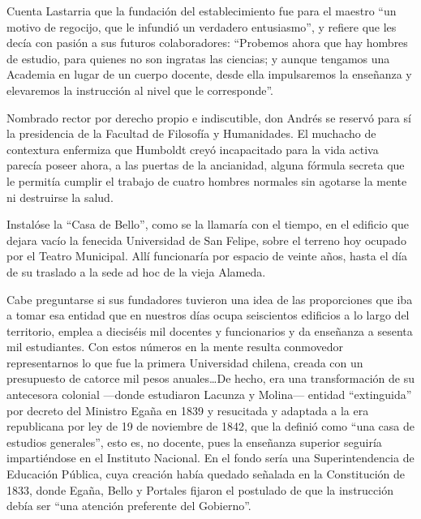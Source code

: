 \documentclass[10pt,twoside,openright]{memoir}
\begin{document}
Cuenta Lastarria que la fundación del establecimiento fue para el
maestro ``un motivo de regocijo, que le infundió un verdadero
entusiasmo'', y refiere que les decía con pasión a sus futuros
colaboradores: ``Probemos ahora que hay hombres de estudio, para quienes
no son ingratas las ciencias; y aunque tengamos una Academia en lugar de
un cuerpo docente, desde ella impulsaremos la enseñanza y elevaremos la
instrucción al nivel que le corresponde''.

Nombrado rector por derecho propio e indiscutible, don Andrés se reservó
para sí la presidencia de la Facultad de Filosofía y Humanidades. El
muchacho de contextura enfermiza que Humboldt creyó incapacitado para la
vida activa parecía poseer ahora, a las puertas de la ancianidad, alguna
fórmula secreta que le permitía cumplir el trabajo de cuatro hombres
normales sin agotarse la mente ni destruirse la salud.

Instalóse la ``Casa de Bello'', como se la llamaría con el tiempo, en el
edificio que dejara vacío la fenecida Universidad de San Felipe, sobre
el terreno hoy ocupado por el Teatro Municipal. Allí funcionaría por
espacio de veinte años, hasta el día de su traslado a la sede ad hoc de
la vieja Alameda.

Cabe preguntarse si sus fundadores tuvieron una idea de las proporciones
que iba a tomar esa entidad que en nuestros días ocupa seiscientos
edificios a lo largo del territorio, emplea a dieciséis mil docentes y
funcionarios y da enseñanza a sesenta mil estudiantes. Con estos números
en la mente resulta conmovedor representarnos lo que fue la primera
Universidad chilena, creada con un presupuesto de catorce mil pesos
anuales\ldots De hecho, era una transformación de su antecesora colonial
---donde estudiaron Lacunza y Molina--- entidad ``extinguida'' por decreto
del Ministro Egaña en 1839 y resucitada y adaptada a la era republicana
por ley de 19 de noviembre de 1842, que la definió como ``una casa de
estudios generales'', esto es, no docente, pues la enseñanza superior
seguiría impartiéndose en el Instituto Nacional. En el fondo sería una
Superintendencia de Educación Pública, cuya creación había quedado
señalada en la Constitución de 1833, donde Egaña, Bello y Portales
fijaron el postulado de que la instrucción debía ser ``una atención
preferente del Gobierno''.
\end{document}
